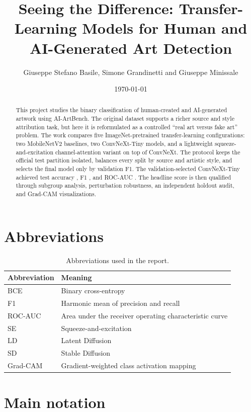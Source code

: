 \documentclass[11pt,a4paper]{article}
\title{Seeing the Difference: Transfer-Learning Models for Human and
AI-Generated Art Detection}
\author{Giuseppe Stefano Basile, Simone Grandinetti and Giuseppe Minissale}
\date{\today}
\begin{document}
\maketitle

\begin{abstract}
This project studies the binary classification of human-created and
AI-generated artwork using AI-ArtBench. The original dataset supports a richer
source and style attribution task, but here it is reformulated as a controlled
``real art versus fake art'' problem. The work compares five ImageNet-pretrained
transfer-learning configurations: two MobileNetV2 baselines, two ConvNeXt-Tiny
models, and a lightweight squeeze-and-excitation channel-attention variant on
top of ConvNeXt.
The protocol keeps the official test partition isolated, balances every split
by source and artistic style, and selects the final model only by validation
F1. The validation-selected ConvNeXt-Tiny achieved test accuracy
\BestTestAccuracy, F1 \BestTestFOne, and ROC-AUC \BestTestAUC. The headline
score is then qualified through subgroup analysis, perturbation robustness, an
independent holdout audit, and Grad-CAM visualizations.
\end{abstract}

\section*{Abbreviations}

\begin{table}[H]
\centering
\begin{tabular}{ll}
\toprule
Abbreviation & Meaning \\
\midrule
BCE & Binary cross-entropy \\
F1 & Harmonic mean of precision and recall \\
ROC-AUC & Area under the receiver operating characteristic curve \\
SE & Squeeze-and-excitation \\
LD & Latent Diffusion \\
SD & Stable Diffusion \\
Grad-CAM & Gradient-weighted class activation mapping \\
\bottomrule
\end{tabular}
\caption{Abbreviations used in the report.}
\label{tab:abbreviations}
\end{table}

\section*{Main notation}
\end{document}
